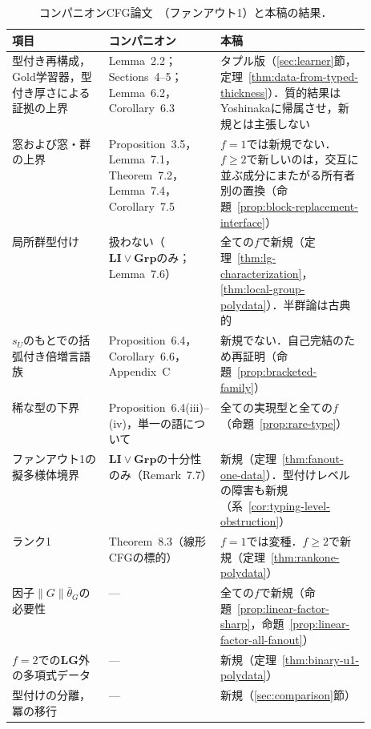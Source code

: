 \documentclass[11pt,a4paper]{ltjsarticle}
\numberwithin{equation}{section}
\theoremstyle{plain}
\theoremstyle{definition}
\theoremstyle{remark}
\begin{document}
\begin{table}[htbp]
\caption{コンパニオンCFG論文~\cite{kuriyamaCFG}（ファンアウト1）と本稿の結果．}
\label{tab:companion-overlap}
\centering
\footnotesize
\setlength{\tabcolsep}{3pt}
\renewcommand{\arraystretch}{1.15}
\begin{tabularx}{\linewidth}{@{}>{\raggedright\arraybackslash}p{0.27\linewidth}>{\raggedright\arraybackslash}p{0.25\linewidth}>{\raggedright\arraybackslash}X@{}}
\hline
項目 & コンパニオン~\cite{kuriyamaCFG} & 本稿\\
\hline
型付き再構成，Gold学習器，型付き厚さによる証拠の上界
 & Lemma~2.2；Sections~4--5；Lemma~6.2，Corollary~6.3
 & タプル版（\ref{sec:learner}節，定理~\ref{thm:data-from-typed-thickness}）．質的結果はYoshinakaに帰属させ，新規とは主張しない\\
窓および窓・群の上界
 & Proposition~3.5，Lemma~7.1，Theorem~7.2，Lemma~7.4，Corollary~7.5
 & $f=1$では新規でない．$f\ge2$で新しいのは，交互に並ぶ成分にまたがる所有者別の置換（命題~\ref{prop:block-replacement-interface}）\\
局所群型付け
 & 扱わない（$\mathbf{LI}\vee\mathbf{Grp}$のみ；Lemma~7.6）
 & 全ての$f$で新規（定理~\ref{thm:lg-characterization}，\ref{thm:local-group-polydata}）．半群論は古典的\\
$s_U$のもとでの括弧付き倍増言語族
 & Proposition~6.4，Corollary~6.6，Appendix~C
 & 新規でない．自己完結のため再証明（命題~\ref{prop:bracketed-family}）\\
稀な型の下界
 & Proposition~6.4(iii)--(iv)，単一の語について
 & 全ての実現型と全ての$f$（命題~\ref{prop:rare-type}）\\
ファンアウト1の擬多様体境界
 & $\mathbf{LI}\vee\mathbf{Grp}$の十分性のみ（Remark~7.7）
 & 新規（定理~\ref{thm:fanout-one-data}）．型付けレベルの障害も新規（系~\ref{cor:typing-level-obstruction}）\\
ランク1
 & Theorem~8.3（線形CFGの標的）
 & $f=1$では変種．$f\ge2$で新規（定理~\ref{thm:rankone-polydata}）\\
因子$\|G\|\bar\theta_G$の必要性
 & ---
 & 全ての$f$で新規（命題~\ref{prop:linear-factor-sharp}，命題~\ref{prop:linear-factor-all-fanout}）\\
$f=2$での$\mathbf{LG}$外の多項式データ
 & ---
 & 新規（定理~\ref{thm:binary-u1-polydata}）\\
型付けの分離，冪の移行
 & ---
 & 新規（\ref{sec:comparison}節）\\
\hline
\end{tabularx}
\end{table}
\end{document}
